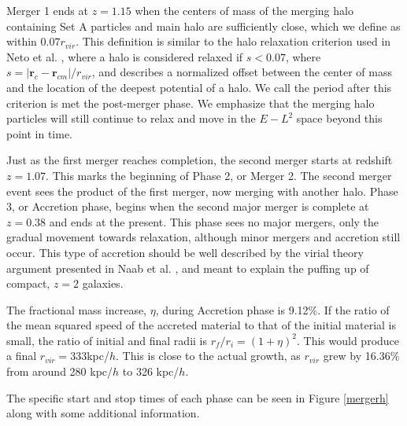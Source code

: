 \documentclass[a4paper,11pt]{article}
\begin{document}
Merger 1 ends at $z=1.15$ when the centers of mass of the merging halo containing Set A particles and main halo are sufficiently close, which we 
define as within $0.07r_{vir}$.  This definition is similar to the halo relaxation criterion used in Neto et al. \citep{Net07}, 
where a halo is considered relaxed if $s<0.07$, where $s=|\boldsymbol{r}_c-\boldsymbol{r}_{cm}|/r_{vir}$, and describes a normalized offset between the center of mass 
and the location of the deepest potential of a halo.  We call the period after this criterion is met the post-merger phase.
We emphasize that the merging halo particles will still continue to relax and move in the $E-L^2$ space beyond this point in time.  

Just as the first merger reaches completion, the second merger starts at redshift $z=1.07$.  This marks the beginning of Phase 2, or Merger 2.
The second merger event sees the product of the first merger, now merging with another halo.  Phase 3, or Accretion phase, begins when the second major merger is complete at $z=0.38$ and ends at the present.  This phase sees no major mergers, only the gradual 
movement towards relaxation, although minor mergers and accretion still occur.  This type of accretion should be well described by the virial theory 
argument presented in Naab et al. \citep{Naa09}, and meant to explain the puffing up of compact, $z=2$ galaxies.  


The fractional mass increase, $\eta$, during Accretion phase is 9.12\%.  If the ratio of the mean squared speed of 
the accreted material to that of the initial material is small, the ratio of initial and final radii is $r_f/r_i=(1+\eta)^2$.  This would produce a 
final $r_{vir}=333$kpc/$h$.  This is close to the actual growth, as $r_{vir}$ grew by 16.36\% from around 280 kpc/$h$ to 326 kpc/$h$.

The specific start and stop times of each phase can be seen in Figure \ref{mergerh} along with some additional information. 
\end{document}
